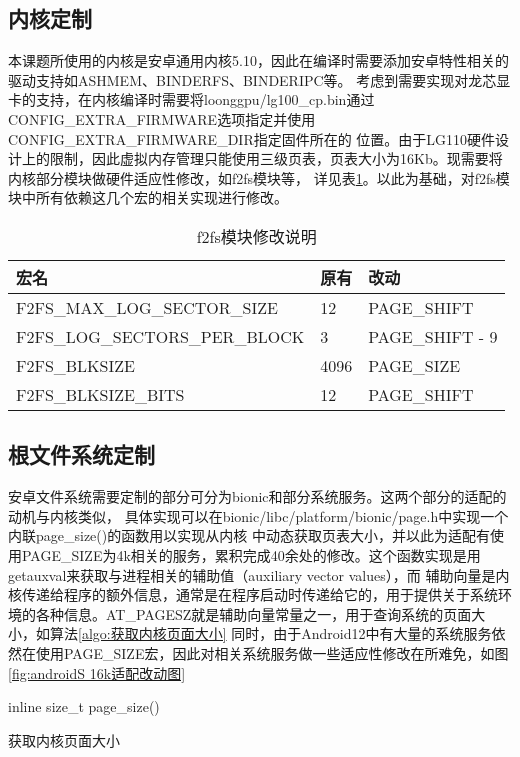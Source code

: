 \subsection{内核定制}
本课题所使用的内核是安卓通用内核5.10，因此在编译时需要添加安卓特性相关的驱动支持如ASHMEM、BINDERFS、BINDERIPC等。
考虑到需要实现对龙芯显卡的支持，在内核编译时需要将loonggpu/lg100\_cp.bin通过CONFIG\_EXTRA\_FIRMWARE选项指定并使用CONFIG\_EXTRA\_FIRMWARE\_DIR指定固件所在的
位置。由于LG110硬件设计上的限制，因此虚拟内存管理只能使用三级页表，页表大小为16Kb。现需要将内核部分模块做硬件适应性修改，如f2fs模块等，
详见表\ref{tab:f2fs模块修改说明}。以此为基础，对f2fs模块中所有依赖这几个宏的相关实现进行修改。

\begin{table}[h]
  \centering
  \caption{f2fs模块修改说明}
  \label{tab:f2fs模块修改说明}
  \begin{tabular}{lll}
    \toprule
    宏名   &   原有  &改动  \\
    \midrule
    F2FS\_MAX\_LOG\_SECTOR\_SIZE & 12 & PAGE\_SHIFT \\
    F2FS\_LOG\_SECTORS\_PER\_BLOCK & 3 & PAGE\_SHIFT - 9 \\
    F2FS\_BLKSIZE & 4096 & PAGE\_SIZE \\
    F2FS\_BLKSIZE\_BITS & 12 & PAGE\_SHIFT \\
    \bottomrule
  \end{tabular}
  \note{}
\end{table}

\subsection{根文件系统定制}
安卓文件系统需要定制的部分可分为bionic和部分系统服务。这两个部分的适配的动机与内核类似，
具体实现可以在bionic/libc/platform/bionic/page.h中实现一个内联page\_size()的函数用以实现从内核
中动态获取页表大小，并以此为适配有使用PAGE\_SIZE为4k相关的服务，累积完成40余处的修改。这个函数实现是用getauxval来获取与进程相关的辅助值（auxiliary vector values），而
辅助向量是内核传递给程序的额外信息，通常是在程序启动时传递给它的，用于提供关于系统环境的各种信息。AT\_PAGESZ就是辅助向量常量之一，用于查询系统的页面大小，如算法\ref{algo:获取内核页面大小}
同时，由于Android12中有大量的系统服务依然在使用PAGE\_SIZE宏，因此对相关系统服务做一些适应性修改在所难免，如图\ref{fig:androidS 16k适配改动图}
\begin{algorithm}
  \SetAlgoLined
  inline size\_t page\_size(){\\
  }
  \caption{获取内核页面大小}
  \label{algo:获取内核页面大小}
\end{algorithm}

